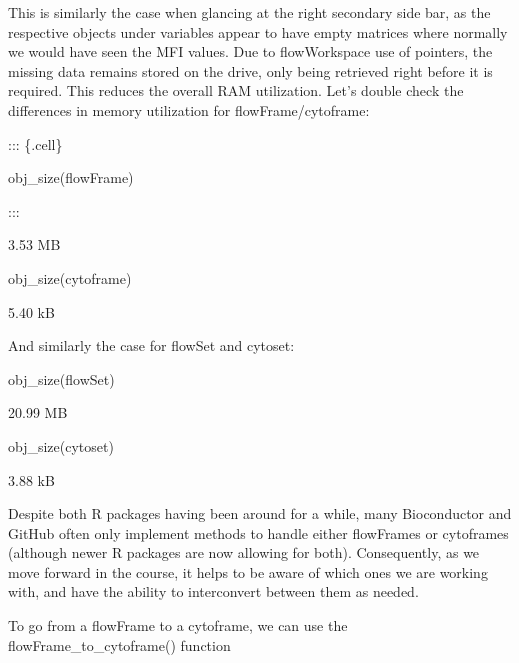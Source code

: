 \documentclass[
  letterpaper,
  DIV=11,
  numbers=noendperiod]{scrartcl}
\newenvironment{Shaded}{\begin{snugshade}}{\end{snugshade}}
\newcommand{\FunctionTok}[1]{\textcolor[rgb]{0.28,0.35,0.67}{#1}}
\newcommand{\NormalTok}[1]{\textcolor[rgb]{0.00,0.23,0.31}{#1}}
\begin{document}
This is similarly the case when glancing at the right secondary side
bar, as the respective objects under variables appear to have empty
matrices where normally we would have seen the MFI values. Due to
flowWorkspace use of pointers, the missing data remains stored on the
drive, only being retrieved right before it is required. This reduces
the overall RAM utilization. Let's double check the differences in
memory utilization for flowFrame/cytoframe:

::: \{.cell\}

\begin{Shaded}
\begin{Highlighting}[]
\FunctionTok{obj\_size}\NormalTok{(flowFrame)}
\end{Highlighting}
\end{Shaded}

:::

3.53 MB

\begin{Shaded}
\begin{Highlighting}[]
\FunctionTok{obj\_size}\NormalTok{(cytoframe)}
\end{Highlighting}
\end{Shaded}

5.40 kB

And similarly the case for flowSet and cytoset:

\begin{Shaded}
\begin{Highlighting}[]
\FunctionTok{obj\_size}\NormalTok{(flowSet)}
\end{Highlighting}
\end{Shaded}

20.99 MB

\begin{Shaded}
\begin{Highlighting}[]
\FunctionTok{obj\_size}\NormalTok{(cytoset)}
\end{Highlighting}
\end{Shaded}

3.88 kB

Despite both R packages having been around for a while, many
Bioconductor and GitHub often only implement methods to handle either
flowFrames or cytoframes (although newer R packages are now allowing for
both). Consequently, as we move forward in the course, it helps to be
aware of which ones we are working with, and have the ability to
interconvert between them as needed.

To go from a flowFrame to a cytoframe, we can use the
flowFrame\_to\_cytoframe() function
\end{document}
